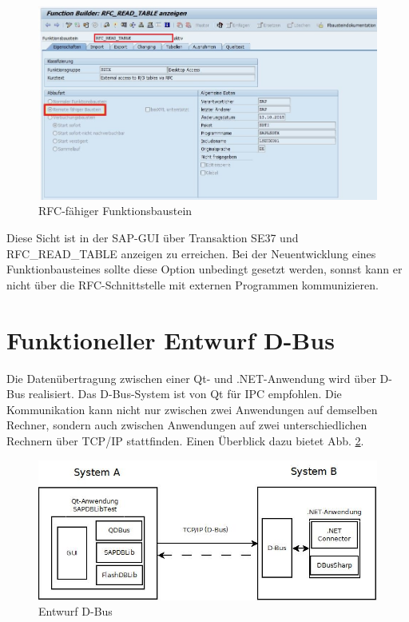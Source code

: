 \begin{figure}[H]
\centering
\includegraphics[width=0.9\linewidth]{images/rfcTheobald}
\caption[RFC-fähiger Funktionsbaustein]{RFC-fähiger Funktionsbaustein}
\label{fig:rfcTheobald}
\end{figure}
Diese Sicht ist in der SAP-GUI über Transaktion SE37 und RFC\_READ\_TABLE anzeigen zu erreichen.
Bei der Neuentwicklung eines Funktionbausteines sollte diese Option unbedingt gesetzt werden, sonnst kann er nicht über die RFC-Schnittstelle mit externen Programmen kommunizieren.

\section{Funktioneller Entwurf D-Bus}
Die Datenübertragung zwischen einer Qt- und .NET-Anwendung wird über D-Bus realisiert. Das D-Bus-System ist von Qt für \acl{IPC} empfohlen. Die Kommunikation kann nicht nur zwischen zwei Anwendungen auf demselben Rechner, sondern auch zwischen Anwendungen auf zwei unterschiedlichen Rechnern über TCP/IP stattfinden. Einen Überblick dazu bietet Abb. \ref{fig:EntwurfDBus}. 

\begin{figure}[H]
\centering
\includegraphics[width=0.8\linewidth]{images/EntwurfDBus}
\caption[Entwurf D-Bus]{Entwurf D-Bus}
\label{fig:EntwurfDBus}
\end{figure}

